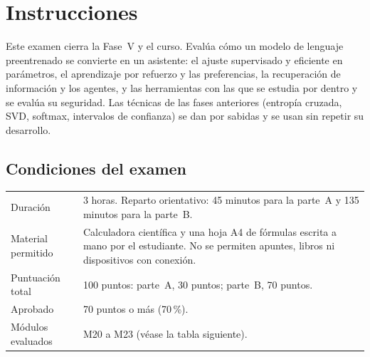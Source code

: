 \chapter*{Instrucciones}

Este examen cierra la Fase~V y el curso. Evalúa cómo un modelo de lenguaje preentrenado se convierte en un asistente: el ajuste supervisado y eficiente en parámetros, el aprendizaje por refuerzo y las preferencias, la recuperación de información y los agentes, y las herramientas con las que se estudia por dentro y se evalúa su seguridad. Las técnicas de las fases anteriores (entropía cruzada, SVD, softmax, intervalos de confianza) se dan por sabidas y se usan sin repetir su desarrollo.

\section*{Condiciones del examen}
\begin{center}
\begin{tabularx}{\textwidth}{@{}lX@{}}
\toprule
Duración & 3 horas. Reparto orientativo: 45 minutos para la parte~A y 135 minutos para la parte~B. \\
Material permitido & Calculadora científica y una hoja A4 de fórmulas escrita a mano por el estudiante. No se permiten apuntes, libros ni dispositivos con conexión. \\
Puntuación total & 100 puntos: parte~A, 30 puntos; parte~B, 70 puntos. \\
Aprobado & 70 puntos o más (70\,\%). \\
Módulos evaluados & M20 a M23 (véase la tabla siguiente). \\
\bottomrule
\end{tabularx}
\end{center}

